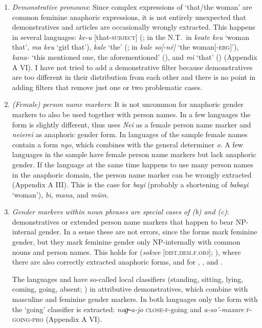 \documentclass[output=collectionpaper]{langsci/langscibook}
\begin{document}
\begin{enumerate}[label=(\alph*)]
\item
\emph{Demonstrative pronouns}: Since complex expressions of ‘that/the woman’ are common feminine anaphoric expressions, it is not entirely unexpected that demonstratives and articles are occasionally wrongly extracted. This happens in several  languages:  \textit{ke-u} [that-\textsc{subject}] (\citealt[428]{Garland1975}; in the N.T.\ in \textit{keate keu} ‘woman that’, \textit{ma keu} ‘girl that’),  \textit{kale} ‘the’ (\citealt[85]{Anderson1989}; in \textit{kale so[-né]} ‘the woman[-\textsc{erg}]’),  \textit{kana-}
‘this mentioned one, the aforementioned’ (\citealt[45]{Scott1989}), and  \textit{mi} ‘that’ (\citealt{Lowing1975}) (Appendix A VI). I have not tried to add a demonstrative filter because demonstratives are too different in their distribution from each other and there is no point in adding filters that remove just one or two problematic cases.
\item
\emph{(Female) person name markers}: It is not uncommon for anaphoric gender markers to also be used together with person names. In a few languages the form is slightly different, thus  uses \textit{Nei} as a female person name marker and \textit{neierei} as anaphoric gender form. In  languages of the sample female names contain a form \textit{ngo}, which combines with the general determiner \textit{o}. A few languages in the sample have female person name markers but lack anaphoric gender. If the language at the same time happens to use many person names in the anaphoric domain, the person name marker can be wrongly extracted (Appendix A III). This is the case for  \textit{bayi} (probably a shortening of \textit{babayi} ‘woman’),  \textit{bi},  \textit{mana}, and  \textit{müm}.
\item
\emph{Gender markers within noun phrases are special cases of (b) and (c)}: demonstratives or extended person name markers that happen to bear NP-internal gender. In a sense these are not errors, since the forms mark feminine gender, but they mark feminine gender only NP-internally with common nouns and person names. This holds for  (\textit{sokwe} [\textsc{dist.dem.f.obj}]; \citealt[87]{Lock2011}), where there are also correctly extracted anaphoric forms, and for , , and .

The  languages  and  have so-called local classifiers (standing, sitting, lying, coming, going, absent; \citealt[62]{Sandalo1997}) in attributive demonstratives, which combine with masculine and feminine gender markers. In both languages only the form with the ‘going’ classifier is extracted:  \textit{naɡ̶-a-jo} \textsc{close-f}-going and  \textit{a-so'-maxare} \textsc{f-going-pro} (Appendix A VI).


\end{enumerate}
\end{document}
